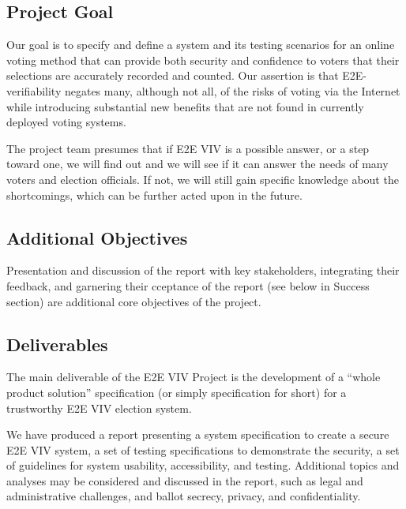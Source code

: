 \subsection{Project Goal}
\label{sec:project-goal}

Our goal is to specify and define a system and its testing scenarios
for an online voting method that can provide both security and
confidence to voters that their selections are accurately recorded and
counted. Our assertion is that E2E-verifiability negates many,
although not all, of the risks of voting via the Internet while
introducing substantial new benefits that are not found in currently
deployed voting systems.

The project team presumes that if E2E VIV is a possible answer, or a
step toward one, we will find out and we will see if it can answer the
needs of many voters and election officials. If not, we will still
gain specific knowledge about the shortcomings, which can be further
acted upon in the future. 

\subsection{Additional Objectives}
\label{sec:addit-object}

Presentation and discussion of the report with key stakeholders,
integrating their feedback, and garnering their cceptance of the
report (see below in Success section) are additional core objectives
of the project. 

\subsection{Deliverables}
\label{sec:deliverables}

The main deliverable of the E2E VIV Project is the development of a
``whole product solution'' specification (or simply specification for
short) for a trustworthy E2E VIV election system.

We have produced a report presenting a system specification to create
a secure E2E VIV system, a set of testing specifications to
demonstrate the security, a set of guidelines for system usability,
accessibility, and testing. Additional topics and analyses may be
considered and discussed in the report, such as legal and
administrative challenges, and ballot secrecy, privacy, and
confidentiality.

